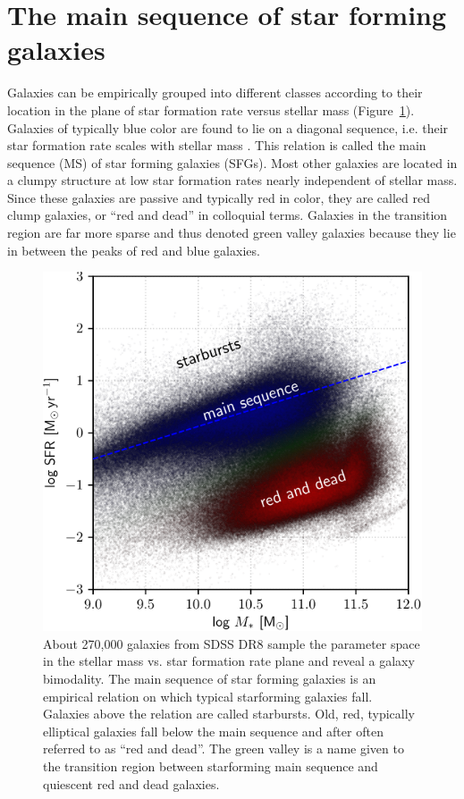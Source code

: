 \section{The main sequence of star forming galaxies}
\label{introduction: section: star formation: main sequence}

Galaxies can be empirically grouped into different classes according to their location in the plane of star formation rate versus stellar mass (Figure~\ref{introduction: figure: star formation: MS}).
Galaxies of typically blue color are found to lie on a diagonal sequence, i.e. their star formation rate scales with stellar mass \citep[e.g.][]{2004MNRAS.351.1151B,2011A&A...533A.119E}. This relation is called the main sequence (MS) of star forming galaxies (SFGs).
Most other galaxies are located in a clumpy structure at low star formation rates nearly independent of stellar mass. Since these galaxies are passive and typically red in color, they are called red clump galaxies, or ``red and dead'' in colloquial terms.
Galaxies in the transition region are far more sparse and thus denoted green valley galaxies because they lie in between the peaks of red and blue galaxies.

\begin{figure}[t]
	\centering
	\includegraphics[width=0.6\linewidth]{images/chapters/introduction/sf/SDSS_main_sequence.pdf}
	\caption[Main sequence of star forming galaxies]{About 270,000 galaxies from SDSS DR8 sample the parameter space in the stellar mass vs. star formation rate plane and reveal a galaxy bimodality. The main sequence of star forming galaxies is an empirical relation on which typical starforming galaxies fall. Galaxies above the relation are called starbursts. Old, red, typically elliptical galaxies fall below the main sequence and after often referred to as ``red and dead''. The green valley is a name given to the transition region between starforming main sequence and quiescent red and dead galaxies.}
	\label{introduction: figure: star formation: MS}
\end{figure}

